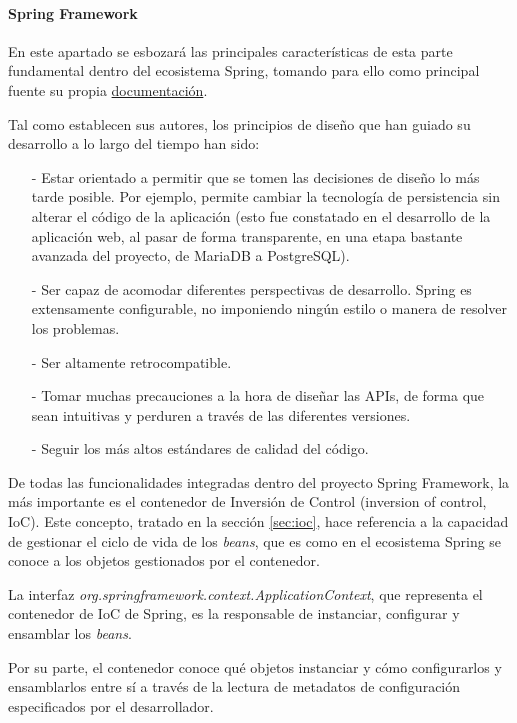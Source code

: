 \documentclass[a4paper]{article}
\begin{document}
    \paragraph{Spring Framework} \label{sec:springframework}
    En este apartado se esbozará las principales características de esta parte fundamental dentro del ecosistema Spring, tomando para ello como principal fuente su propia \href{https://docs.spring.io/spring/docs/current/spring-framework-reference/}{documentación}.
    
    Tal como establecen sus autores, los principios de diseño que han guiado su desarrollo a lo largo del tiempo han sido:
    
    \begin{itemize}
    	\item[-] Estar orientado a permitir que se tomen las decisiones de diseño lo más tarde posible. Por ejemplo, permite cambiar la tecnología de persistencia sin alterar el código de la aplicación (esto fue constatado en el desarrollo de la aplicación web, al pasar de forma transparente, en una etapa bastante avanzada del proyecto, de MariaDB a PostgreSQL).
    	\item[-] Ser capaz de acomodar diferentes perspectivas de desarrollo. Spring es extensamente configurable, no imponiendo ningún estilo o manera de resolver los problemas.
    	\item[-] Ser altamente retrocompatible.
    	\item[-] Tomar muchas precauciones a la hora de diseñar las APIs, de forma que sean intuitivas y perduren a través de las diferentes versiones.
    	\item[-] Seguir los más altos estándares de calidad del código.
    \end{itemize}
    
    De todas las funcionalidades integradas dentro del proyecto Spring Framework, la más importante es el contenedor de Inversión de Control (inversion of control, IoC). Este concepto, tratado en la sección \ref{sec:ioc}, hace referencia a la capacidad de gestionar el ciclo de vida de los \emph{beans}, que es como en el ecosistema Spring se conoce a los objetos gestionados por el contenedor.
    
    La interfaz \emph{org.springframework.context.ApplicationContext}, que representa el contenedor de IoC de Spring, es la responsable de instanciar, configurar y ensamblar los \emph{beans}.
    
    Por su parte, el contenedor conoce qué objetos instanciar y cómo configurarlos y ensamblarlos entre sí a través de la lectura de metadatos de configuración especificados por el desarrollador.
    
\end{document}

